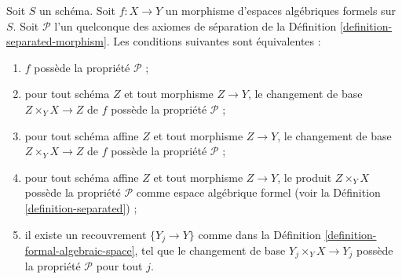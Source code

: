 \begin{lemma}
\label{lemma-separated-local}
Soit $S$ un schéma. Soit $f : X \to Y$ un morphisme d'espaces algébriques formels
sur $S$. Soit $\mathcal{P}$ l'un quelconque des axiomes de séparation de la
Définition \ref{definition-separated-morphism}.
Les conditions suivantes sont équivalentes :
\begin{enumerate}
\item $f$ possède la propriété $\mathcal{P}$ ;
\item pour tout schéma $Z$ et tout morphisme $Z \to Y$, le
changement de base $Z \times_Y X \to Z$ de $f$ possède la propriété $\mathcal{P}$ ;
\item pour tout schéma affine $Z$ et tout morphisme $Z \to Y$, le
changement de base $Z \times_Y X \to Z$ de $f$ possède la propriété $\mathcal{P}$ ;
\item pour tout schéma affine $Z$ et tout morphisme $Z \to Y$, le
produit $Z \times_Y X$ possède la propriété $\mathcal{P}$ comme espace algébrique formel (voir la
Définition \ref{definition-separated}) ;
\item il existe un recouvrement $\{Y_j \to Y\}$ comme dans la
Définition \ref{definition-formal-algebraic-space},
tel que le changement de base $Y_j \times_Y X \to Y_j$ possède
la propriété $\mathcal{P}$ pour tout $j$.
\end{enumerate}
\end{lemma}

